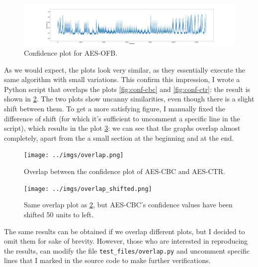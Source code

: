 \documentclass[12pt,a4paper]{book}
\theoremstyle{definition}
\begin{document}
	\begin{figure}[!ht]
		\hspace*{-3.6cm}
		\includegraphics[scale=0.18]{../test_files/output_nosymbolic_FastSpec_wider/window50_overlap49_fig/testing_AES_CBC_nosymbolic.png}
		\caption{Confidence plot for AES-OFB.}
		\label{fig:conf-ofb}
	\end{figure}
	As we would expect, the plots look very similar, as they essentially execute the same algorithm with small variations. %
	This confirm this impression, I wrote a Python script that overlaps the plots \ref{fig:conf-cbc} and \ref{fig:conf-ctr}: the result is shown in \ref{fig:overlap}. The two plots show uncanny similarities, even though there is a slight shift between them. To get a more satisfying figure, I manually fixed the difference of shift (for which it's sufficient to uncomment a specific line in the script), which results in the plot \ref{fig:overlap-shifted}: we can see that the graphs overlap almost completely, apart from the a small section at the beginning and at the end.
	
	\begin{figure}[!ht]
		\hspace*{-1.5cm}
		\texttt{[image: ../imgs/overlap.png]}
		\caption{Overlap between the confidence plot of AES-CBC and AES-CTR.}
		\label{fig:overlap}
	\end{figure}
	
	\begin{figure}[!ht]
		\hspace*{-1.5cm}
		\texttt{[image: ../imgs/overlap\_shifted.png]}
		\caption{Same overlap plot as \ref{fig:overlap}, but AES-CBC's confidence values have been shifted 50 units to left.}
		\label{fig:overlap-shifted}
	\end{figure}

	The same results can be obtained if we overlap different plots, but I decided to omit them for sake of brevity. However, those who are interested in reproducing the results, can modify the file \texttt{test\_files/overlap.py} and uncomment specific lines that I marked in the source code to make further verifications.
	
\end{document}
